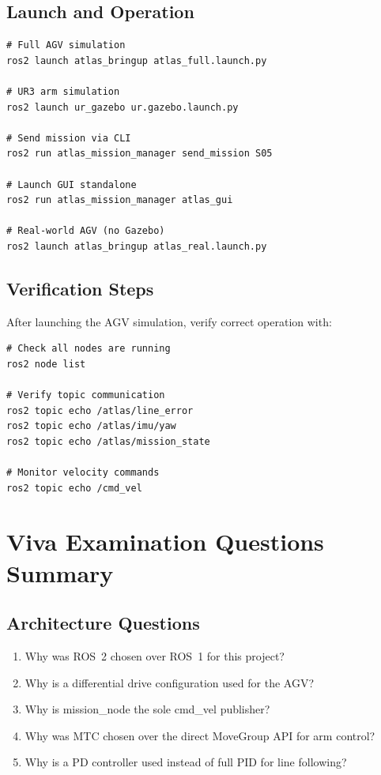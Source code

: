 \documentclass[12pt,a4paper,oneside]{report}
\begin{document}
\section*{Launch and Operation}

\begin{verbatim}
# Full AGV simulation
ros2 launch atlas_bringup atlas_full.launch.py

# UR3 arm simulation
ros2 launch ur_gazebo ur.gazebo.launch.py

# Send mission via CLI
ros2 run atlas_mission_manager send_mission S05

# Launch GUI standalone
ros2 run atlas_mission_manager atlas_gui

# Real-world AGV (no Gazebo)
ros2 launch atlas_bringup atlas_real.launch.py
\end{verbatim}

\section*{Verification Steps}

After launching the AGV simulation, verify correct operation with:
\begin{verbatim}
# Check all nodes are running
ros2 node list

# Verify topic communication
ros2 topic echo /atlas/line_error
ros2 topic echo /atlas/imu/yaw
ros2 topic echo /atlas/mission_state

# Monitor velocity commands
ros2 topic echo /cmd_vel
\end{verbatim}


\chapter{Viva Examination Questions Summary}

\section*{Architecture Questions}

\begin{enumerate}
\item Why was ROS~2 chosen over ROS~1 for this project?
\item Why is a differential drive configuration used for the AGV?
\item Why is mission\_node the sole cmd\_vel publisher?
\item Why was MTC chosen over the direct MoveGroup API for arm control?
\item Why is a PD controller used instead of full PID for line following?
\end{enumerate}
\end{document}
